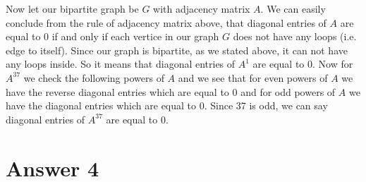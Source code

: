 \documentclass[11pt]{article}
\begin{document}
Now let our bipartite graph be $G$ with adjacency matrix $A$. We can easily conclude from the rule of adjacency matrix above, that diagonal entries of $A$ are equal to $0$ if and only if each vertice in our graph $G$ does not have any loops (i.e. edge to itself). Since our graph is bipartite, as we stated above, it can not have any loops inside. So it means that diagonal entries of $A^1$ are equal to $0$. Now for $A^{37}$ we check the following powers of $A$ and we see that for even powers of $A$ we have the reverse diagonal entries which are equal to $0$ and for odd powers of $A$ we have the diagonal entries which are equal to $0$. Since 37 is odd, we can say diagonal entries of $A^{37}$ are equal to $0$.\\

\section*{Answer 4}
\end{document}
